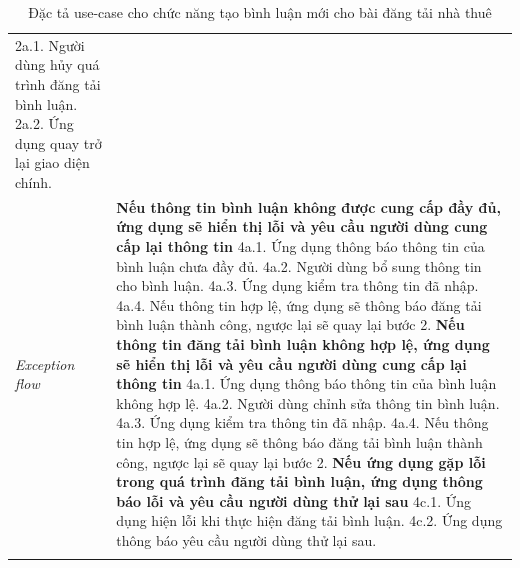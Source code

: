 \begin{center}
\begin{longtable}{
        |>{\raggedright\arraybackslash}p{3cm}
        |>{\raggedright\arraybackslash}p{13cm}
        |}
        2a.1. Người dùng hủy quá trình đăng tải bình luận. \newline
        2a.2. Ứng dụng quay trở lại giao diện chính.
        \\\hdashline
        \rowcolor{cyan!10!white} \textit{Exception flow} & 
        \textbf{Nếu thông tin bình luận không được cung cấp đầy đủ, ứng dụng sẽ hiển thị lỗi và yêu cầu người dùng cung cấp lại thông tin} \newline
        4a.1. Ứng dụng thông báo thông tin của bình luận chưa đầy đủ. \newline
        4a.2. Người dùng bổ sung thông tin cho bình luận. \newline
        4a.3. Ứng dụng kiểm tra thông tin đã nhập. \newline
        4a.4. Nếu thông tin hợp lệ, ứng dụng sẽ thông báo đăng tải bình luận thành công, ngược lại sẽ quay lại bước 2. \newline
        \textbf{Nếu thông tin đăng tải bình luận không hợp lệ, ứng dụng sẽ hiển thị lỗi và yêu cầu người dùng cung cấp lại thông tin} \newline
        4a.1. Ứng dụng thông báo thông tin của bình luận không hợp lệ. \newline
        4a.2. Người dùng chỉnh sửa thông tin bình luận. \newline
        4a.3. Ứng dụng kiểm tra thông tin đã nhập. \newline
        4a.4. Nếu thông tin hợp lệ, ứng dụng sẽ thông báo đăng tải bình luận thành công, ngược lại sẽ quay lại bước 2. \newline
        \textbf{Nếu ứng dụng gặp lỗi trong quá trình đăng tải bình luận, ứng dụng thông báo lỗi và yêu cầu người dùng thử lại sau} \newline
        4c.1. Ứng dụng hiện lỗi khi thực hiện đăng tải bình luận. \newline
        4c.2. Ứng dụng thông báo yêu cầu người dùng thử lại sau.
        \\\hline
        \caption{Đặc tả use-case cho chức năng tạo bình luận mới cho bài đăng tải nhà thuê}
    \end{longtable}
\end{center}
